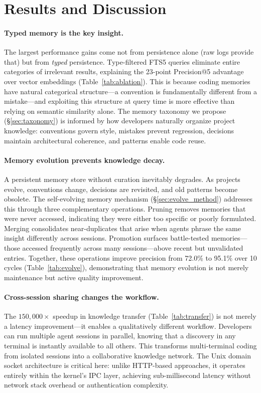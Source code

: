 \documentclass{article}
\begin{document}
\section{Results and Discussion}
\label{sec:results}

\paragraph{Typed memory is the key insight.}
The largest performance gains come not from persistence alone (raw logs provide that) but from \emph{typed} persistence. Type-filtered FTS5 queries eliminate entire categories of irrelevant results, explaining the 23-point Precision@5 advantage over vector embeddings (Table~\ref{tab:ablation}). This is because coding memories have natural categorical structure---a convention is fundamentally different from a mistake---and exploiting this structure at query time is more effective than relying on semantic similarity alone. The memory taxonomy we propose (\S\ref{sec:taxonomy}) is informed by how developers naturally organize project knowledge: conventions govern style, mistakes prevent regression, decisions maintain architectural coherence, and patterns enable code reuse.

\paragraph{Memory evolution prevents knowledge decay.}
A persistent memory store without curation inevitably degrades. As projects evolve, conventions change, decisions are revisited, and old patterns become obsolete. The self-evolving memory mechanism (\S\ref{sec:evolve_method}) addresses this through three complementary operations. Pruning removes memories that were never accessed, indicating they were either too specific or poorly formulated. Merging consolidates near-duplicates that arise when agents phrase the same insight differently across sessions. Promotion surfaces battle-tested memories---those accessed frequently across many sessions---above recent but unvalidated entries. Together, these operations improve precision from 72.0\% to 95.1\% over 10 cycles (Table~\ref{tab:evolve}), demonstrating that memory evolution is not merely maintenance but active quality improvement.

\paragraph{Cross-session sharing changes the workflow.}
The $150{,}000\times$ speedup in knowledge transfer (Table~\ref{tab:transfer}) is not merely a latency improvement---it enables a qualitatively different workflow. Developers can run multiple agent sessions in parallel, knowing that a discovery in any terminal is instantly available to all others. This transforms multi-terminal coding from isolated sessions into a collaborative knowledge network. The Unix domain socket architecture is critical here: unlike HTTP-based approaches, it operates entirely within the kernel's IPC layer, achieving sub-millisecond latency without network stack overhead or authentication complexity.
\end{document}
